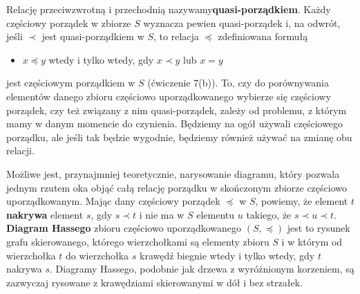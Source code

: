 \documentclass[14pt]{extarticle}
\begin{document}
\begin{changemargin}{160pt}{0pt}
Relację przeciwzwrotną i przechodnią nazywamy\newline \textbf{quasi-porządkiem}. Każdy częściowy porządek w zbiorze $\mathit{S}$ wyznacza pewien quasi-porządek i, na odwrót, jeśli $\prec$ jest quasi-porządkiem w $\mathit{S}$, to relacja $\preceq$ zdefiniowana formułą

\begin{itemize}
    \item[] $\mathit{x} \preceq \mathit{y}$ wtedy i tylko wtedy, gdy $\mathit{x} \prec \mathit{y}$ lub $\mathit{x} = \mathit{y}$
\end{itemize}

jest częściowym porządkiem w $\mathit{S}$ (ćwiczenie 7(b)). To, czy do porównywania elementów danego zbioru częściowo uporządkowanego wybierze się częściowy porządek, czy też związany z nim quasi-porządek, zależy od problemu, z którym mamy w danym momencie do czynienia. Będziemy na ogół używali częściowego porządku, ale jeśli tak będzie wygodnie, będziemy również używać na zmianę obu relacji.

\qquad Możliwe jest, przynajmniej teoretycznie, narysowanie diagramu, który pozwala jednym rzutem oka objąć całą relację porządku w skończonym zbiorze częściowo uporządkowanym. Mając dany częściowy porządek $\preceq$ w $\mathit{S}$, powiemy, że element $\mathit{t}$ \textbf{nakrywa} element $\mathit{s}$, gdy $\mathit{s} \prec \mathit{t}$ i nie ma w $\mathit{S}$ elementu $\mathit{u}$ takiego, że $\mathit{s} \prec \mathit{u} \prec \mathit{t}$. \textbf{Diagram Hassego} zbioru częściowo uporządkowanego $(\mathit{S},\preceq)$ jest to rysunek grafu skierowanego, którego wierzchołkami są elementy zbioru $\mathit{S}$ i w którym od wierzchołka $\mathit{t}$ do wierzchołka $\mathit{s}$ krawędź biegnie wtedy i tylko wtedy, gdy $\mathit{t}$ nakrywa $\mathit{s}$. Diagramy Hassego, podobnie jak drzewa z wyróżnionym korzeniem, są zazwyczaj rysowane z krawędziami skierowanymi w dół i bez strzałek.
\end{changemargin}

\newpage
\end{document}
